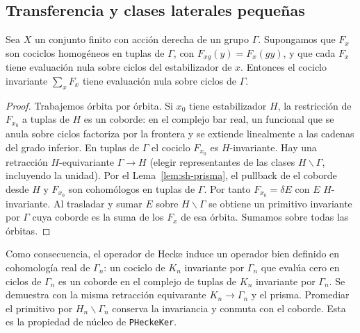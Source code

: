 \subsection{Transferencia y clases laterales pequeñas}

\begin{lema}
\label{lem:sh-transferencia}
Sea $X$ un conjunto finito con acción derecha de un grupo $\Gamma$. Supongamos que $F_x$ son cociclos homogéneos en tuplas de $\Gamma$, con $F_{xg}(y)=F_x(gy)$, y que cada $F_x$ tiene evaluación nula sobre ciclos del estabilizador de $x$. Entonces el cociclo invariante $\sum_x F_x$ tiene evaluación nula sobre ciclos de $\Gamma$.
\end{lema}
\begin{proof}
Trabajemos órbita por órbita. Si $x_0$ tiene estabilizador $H$, la restricción de $F_{x_0}$ a tuplas de $H$ es un coborde: en el complejo bar real, un funcional que se anula sobre ciclos factoriza por la frontera y se extiende linealmente a las cadenas del grado inferior. En tuplas de $\Gamma$ el cociclo $F_{x_0}$ es $H$-invariante. Hay una retracción $H$-equivariante $\Gamma\to H$ (elegir representantes de las clases $H\backslash\Gamma$, incluyendo la unidad). Por el Lema~\ref{lem:sh-prisma}, el pullback de el coborde desde $H$ y $F_{x_0}$ son cohomólogos en tuplas de $\Gamma$. Por tanto $F_{x_0}=\delta E$ con $E$ $H$-invariante. Al trasladar y sumar $E$ sobre $H\backslash\Gamma$ se obtiene un primitivo invariante por $\Gamma$ cuya coborde es la suma de los $F_x$ de esa órbita. Sumamos sobre todas las órbitas.
\end{proof}

Como consecuencia, el operador de Hecke induce un operador bien definido en cohomología real de $\Gamma_n$: un cociclo de $K_n$ invariante por $\Gamma_n$ que evalúa cero en ciclos de $\Gamma_n$ es un coborde en el complejo de tuplas de $K_n$ invariante por $\Gamma_n$. Se demuestra con la misma retracción equivarante $K_n\to\Gamma_n$ y el prisma. Promediar el primitivo por $H_n\backslash\Gamma_n$ conserva la invariancia y conmuta con el coborde. Esta es la propiedad de núcleo de \texttt{PHeckeKer}.

